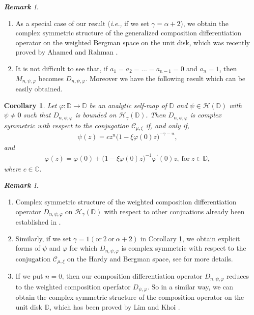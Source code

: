 \documentclass[12pt, reqno]{amsart}
\newtheorem{corollary}[theorem]{Corollary}
\theoremstyle{definition}
\theoremstyle{remark}
\newtheorem{remark}[theorem]{\bf{Remark}}
\numberwithin{equation}{section}
\begin{document}
\begin{remark}
	\begin{enumerate}
		\item[(i)] 	As a special case of our result ({\it i.e.,} if we set $\gamma=\alpha+2$), we obtain the complex symmetric structure of the generalized composition differentiation operator on the weighted Bergman space on the unit disk, which was recently proved by Ahamed and Rahman \cite[Theorem 2.1]{Ahamed_Rahman_2023}.
	\item[(ii)] It is not difficult to see that, if $a_1=a_2=\dots=a_{n-1}=0$ and $a_n=1$, then $M_{n,\psi,\varphi}$ becomes $D_{n,\psi,\varphi}$. Moreover we have the following result which can be easily obtained.
	\end{enumerate}
	
\end{remark}




\begin{corollary}\label{Cor_3.6}
 Let $\varphi: \mathbb{D}\longrightarrow \mathbb{D}$ be an analytic self-map of $\mathbb{D}$ and $\psi\in \mathcal{H}(\mathbb{D})$ with $\psi \neq 0$ such that $D_{n, \psi, \varphi}$ is bounded on $\mathcal{H}_\gamma(\mathbb{D})$. Then $D_{n,\psi,\varphi}$ is complex symmetric with respect to the conjugation $\mathcal{C}_{\mu, \xi}$ if, and only if,
\begin{gather*}
\psi(z)=cz^{n}\big(1-\xi \varphi(0) z\big)^{-\gamma-n},
\end{gather*}
and 
\begin{gather*}
\varphi(z)=\varphi(0)+\big(1-\xi \varphi(0) z\big)^{-1}\varphi^{\prime}(0)z,~ \mbox{for}~ z\in \mathbb{D},
\end{gather*}
where $c\in \mathbb{C}$.
\end{corollary}



\begin{remark}
	\begin{enumerate}
		\item [(i)] Complex symmetric structure of the weighted composition differentiation operator $D_{n,\psi,\varphi}$ on $\mathcal{H}_\gamma(\mathbb{D})$ with respect to other conjuations already been established in \cite{Lo_Loh_JMAA_2023}.
	\item[(ii)] Similarly, if we set $\gamma=1(\mbox{or}~ 2 ~\mbox{or}~ \alpha+2)$ in Corollary \ref{Cor_3.6}, we obtain explicit forms of $\psi$ and $\varphi$ for which $D_{n,\psi,\varphi}$ is complex symmetric with respect to the conjugation $\mathcal{C}_{\mu, \xi}$ on the Hardy and Bergman space, see \cite{Allu_Haldar_Pal_2023, Han_Wang_JMAA_2021,Han_Wang_CAOT_2021} for more details. 
\item[(iii)]  If we put ${n}=0$, then our composition differentiation operator $D_{n,\psi,\varphi}$ reduces to the weighted composition operfator $D_{\psi,\varphi}$. So in a similar way, we can obtain the complex symmetric structure of the composition operator on the unit disk $\mathbb{D}$, which has been proved by Lim and Khoi \cite{Lim_Khoi_JMAA_2018}.
	\end{enumerate}	
\end{remark}
\end{document}
